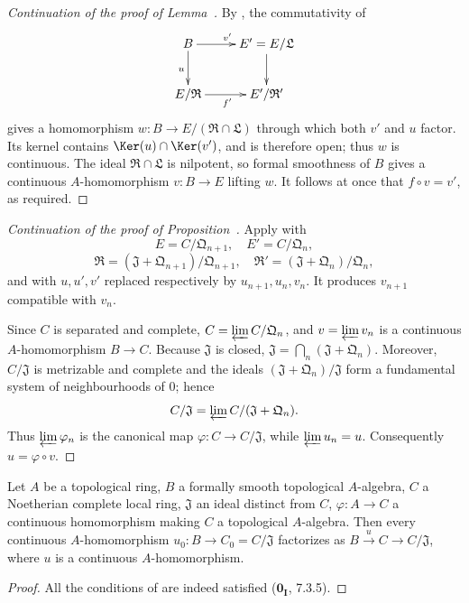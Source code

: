\begin{proof}[Continuation of the proof of Lemma~{\rm{}}]
By , the commutativity of
\[
\xymatrix{
  B \ar[r]^{v'} \ar[d]_u & E'=E/\mathfrak{L} \ar[d] \\
  E/\mathfrak{R} \ar[r]_{f'} & E'/\mathfrak{R}'
}
\]
gives a homomorphism $w:B\to E/(\mathfrak{R}\cap\mathfrak{L})$ through which both $v'$ and $u$ factor.
Its kernel contains $\Ker(u)\cap\Ker(v')$, and is therefore open; thus $w$ is continuous.
The ideal $\mathfrak{R}\cap\mathfrak{L}$ is nilpotent, so formal smoothness of $B$ gives a continuous $A$-homomorphism $v:B\to E$ lifting $w$.
It follows at once that $f\circ v=v'$, as required.
\end{proof}

\begin{proof}[Continuation of the proof of Proposition~{\rm{}}]
Apply  with
\[
  E=C/\mathfrak{Q}_{n+1},\quad E'=C/\mathfrak{Q}_n,
\]
\[
  \mathfrak{R}=(\mathfrak{J}+\mathfrak{Q}_{n+1})/\mathfrak{Q}_{n+1},\quad
  \mathfrak{R}'=(\mathfrak{J}+\mathfrak{Q}_n)/\mathfrak{Q}_n,
\]
and with $u,u',v'$ replaced respectively by $u_{n+1},u_n,v_n$.
It produces $v_{n+1}$ compatible with $v_n$.

Since $C$ is separated and complete, $C=\varprojlim C/\mathfrak{Q}_n$, and $v=\varprojlim v_n$ is a continuous $A$-homomorphism $B\to C$.
Because $\mathfrak{J}$ is closed, $\mathfrak{J}=\bigcap_n(\mathfrak{J}+\mathfrak{Q}_n)$.
Moreover, $C/\mathfrak{J}$ is metrizable and complete and the ideals $(\mathfrak{J}+\mathfrak{Q}_n)/\mathfrak{J}$ form a fundamental system of neighbourhoods of $0$; hence
\[
  C/\mathfrak{J}=\varprojlim C/(\mathfrak{J}+\mathfrak{Q}_n).
\]
Thus $\varprojlim\varphi_n$ is the canonical map $\varphi:C\to C/\mathfrak{J}$, while $\varprojlim u_n=u$.
Consequently $u=\varphi\circ v$.
\end{proof}

\begin{corollary}[19.3.11]
\label{0.19.3.11}
Let $A$ be a topological ring, $B$ a formally smooth topological $A$-algebra, $C$ a Noetherian complete local ring, $\mathfrak{J}$ an ideal distinct from $C$, $\varphi:A\to C$ a continuous homomorphism making $C$ a topological $A$-algebra.
Then every continuous $A$-homomorphism $u_0:B\to C_0=C/\mathfrak{J}$ factorizes as $B\xrightarrow{u}C\to C/\mathfrak{J}$, where $u$ is a continuous $A$-homomorphism.
\end{corollary}

\begin{proof}
All the conditions of  are indeed satisfied ($\mathbf{0_I}$, 7.3.5).
\end{proof}

